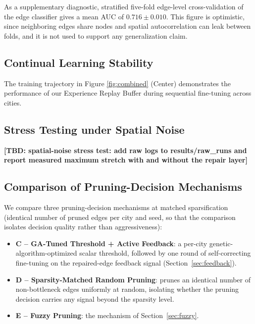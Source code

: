 \documentclass[journal]{IEEEtran}
\newcommand{\tbd}[1]{\textbf{[TBD: #1]}}
\begin{document}
As a supplementary diagnostic, stratified five-fold edge-level cross-validation of the edge classifier gives a mean AUC of $0.716 \pm 0.010$. This figure is optimistic, since neighboring edges share nodes and spatial autocorrelation can leak between folds, and it is not used to support any generalization claim.

\subsection{Continual Learning Stability}
The training trajectory in Figure \ref{fig:combined} (Center) demonstrates the performance of our Experience Replay Buffer during sequential fine-tuning across cities.

\subsection{Stress Testing under Spatial Noise}
\tbd{spatial-noise stress test: add raw logs to results/raw\_runs and report measured maximum stretch with and without the repair layer}

\subsection{Comparison of Pruning-Decision Mechanisms}
\label{sec:fuzzy-results}

We compare three pruning-decision mechanisms at matched sparsification (identical number of pruned edges per city and seed, so that the comparison isolates decision quality rather than aggressiveness):
\begin{itemize}
    \item \textbf{C -- GA-Tuned Threshold + Active Feedback}: a per-city genetic-algorithm-optimized scalar threshold, followed by one round of self-correcting fine-tuning on the repaired-edge feedback signal (Section~\ref{sec:feedback}).
    \item \textbf{D -- Sparsity-Matched Random Pruning}: prunes an identical number of non-bottleneck edges uniformly at random, isolating whether the pruning decision carries any signal beyond the sparsity level.
    \item \textbf{E -- Fuzzy Pruning}: the mechanism of Section~\ref{sec:fuzzy}.
\end{itemize}
\end{document}
